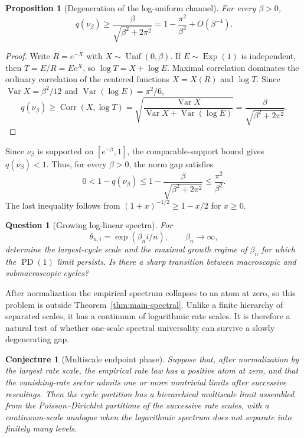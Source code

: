\documentclass[11pt]{article}
\newtheorem{proposition}[theorem]{Proposition}
\newtheorem{conjecture}[theorem]{Conjecture}
\newtheorem{question}[theorem]{Question}
\theoremstyle{definition}
\theoremstyle{remark}
\newcommand{\Var}{\operatorname{Var}}
\newcommand{\Corr}{\operatorname{Corr}}
\newcommand{\Exp}{\operatorname{Exp}}
\newcommand{\Unif}{\operatorname{Unif}}
\newcommand{\PD}{\operatorname{PD}}
\begin{document}
\begin{proposition}[Degeneration of the log-uniform channel]
\label{prop:log-uniform-lower}
For every $\beta>0$,
\begin{equation}
 q(\nu_\beta)\ge
 \frac{\beta}{\sqrt{\beta^2+2\pi^2}}
 =1-\frac{\pi^2}{\beta^2}+O(\beta^{-4}).
 \label{eq:log-uniform-gap-lower}
\end{equation}
\end{proposition}

\begin{proof}
Write $R=e^{-X}$ with $X\sim\Unif(0,\beta)$.  If $E\sim\Exp(1)$ is
independent, then $T=E/R=Ee^X$, so
$\log T=X+\log E$.  Maximal correlation dominates the ordinary correlation of
the centered functions $X=X(R)$ and $\log T$.  Since
$\Var X=\beta^2/12$ and $\Var(\log E)=\pi^2/6$,
\[
 q(\nu_\beta)\ge\Corr(X,\log T)
 =\sqrt{\frac{\Var X}{\Var X+\Var(\log E)}}
 =\frac{\beta}{\sqrt{\beta^2+2\pi^2}}.
\]
\end{proof}

Since $\nu_\beta$ is supported on $[e^{-\beta},1]$, the comparable-support
bound gives $q(\nu_\beta)<1$.  Thus, for every $\beta>0$, the norm gap satisfies
\[
 0<1-q(\nu_\beta)
 \le1-\frac{\beta}{\sqrt{\beta^2+2\pi^2}}
 \le\frac{\pi^2}{\beta^2}.
\]
The last inequality follows from $(1+x)^{-1/2}\ge1-x/2$ for $x\ge0$.

\begin{question}[Growing log-linear spectra]
\label{q:log-linear-growth}
For
\[
 \theta_{n,i}=\exp(\beta_n i/n),
 \qquad \beta_n\longrightarrow\infty,
\]
determine the largest-cycle scale and the maximal growth regime of $\beta_n$
for which the $\PD(1)$ limit persists.  Is there a sharp transition between
macroscopic and submacroscopic cycles?
\end{question}

After normalization the empirical spectrum collapses to an atom at zero, so
this problem is outside Theorem~\ref{thm:main-spectral}.  Unlike a finite
hierarchy of separated scales, it has a continuum of logarithmic rate scales.
It is therefore a natural test of whether one-scale spectral universality can
survive a slowly degenerating gap.

\begin{conjecture}[Multiscale endpoint phase]
\label{conj:multiscale}
Suppose that, after normalization by the largest rate scale, the empirical rate
law has a positive atom at zero, and that the vanishing-rate sector admits one
or more nontrivial limits after successive rescalings.  Then the cycle
partition has a hierarchical multiscale limit assembled from the
Poisson--Dirichlet partitions of the successive rate scales, with a
continuum-scale analogue when the logarithmic spectrum does not separate into
finitely many levels.
\end{conjecture}
\end{document}
